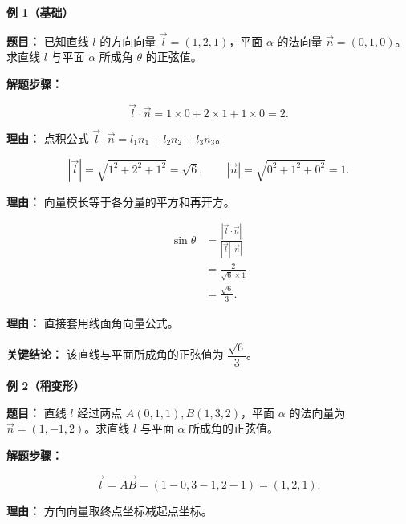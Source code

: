 \begin{examplebox}

	\textbf{\textcolor{CExample}{例 1（基础）}}

	\textbf{\textcolor{CExample}{题目：}} 已知直线 $l$ 的方向向量 $\vec{l}=(1,2,1)$，平面 $\alpha$ 的法向量 $\vec{n}=(0,1,0)$。求直线 $l$ 与平面 $\alpha$ 所成角 $\theta$ 的正弦值。

	\textbf{\textcolor{CExample}{解题步骤：}}

	\begin{description}[style=nextline, leftmargin=2.8em, labelsep=0.5em, itemsep=0.45em]
		\item[\textbf{第一步（计算点积）：}]
		      \[
			      \vec{l}\cdot\vec{n}=1\times0+2\times1+1\times0=2.
		      \]
		      \par\textbf{理由：}
		      点积公式 $\vec{l}\cdot\vec{n}=l_1n_1+l_2n_2+l_3n_3$。

		\item[\textbf{第二步（计算模长）：}]
		      \[
			      |\vec{l}|=\sqrt{1^2+2^2+1^2}=\sqrt{6},
			      \qquad
			      |\vec{n}|=\sqrt{0^2+1^2+0^2}=1.
		      \]
		      \par\textbf{理由：}
		      向量模长等于各分量的平方和再开方。

		\item[\textbf{第三步（代入公式）：}]
		      \[
			      \begin{aligned}
				      \sin\theta
				       & = \frac{|\vec{l}\cdot\vec{n}|}{|\vec{l}|\,|\vec{n}|} \\
				       & = \frac{2}{\sqrt{6}\times1}                          \\
				       & = \frac{\sqrt{6}}{3}.
			      \end{aligned}
		      \]
		      \par\textbf{理由：}
		      直接套用线面角向量公式。
	\end{description}

	\textbf{\textcolor{CExample}{关键结论：}} 该直线与平面所成角的正弦值为 $\dfrac{\sqrt{6}}{3}$。

	\medskip

	\textbf{\textcolor{CExample}{例 2（稍变形）}}

	\textbf{\textcolor{CExample}{题目：}} 直线 $l$ 经过两点 $A(0,1,1),B(1,3,2)$，平面 $\alpha$ 的法向量为 $\vec{n}=(1,-1,2)$。求直线 $l$ 与平面 $\alpha$ 所成角的正弦值。

	\textbf{\textcolor{CExample}{解题步骤：}}

	\begin{description}[style=nextline, leftmargin=2.8em, labelsep=0.5em, itemsep=0.45em]
		\item[\textbf{第一步（求方向向量）：}]
		      \[
			      \vec{l}=\overrightarrow{AB}=(1-0,3-1,2-1)=(1,2,1).
		      \]
		      \par\textbf{理由：}
		      方向向量取终点坐标减起点坐标。


\end{description}
\end{examplebox}
